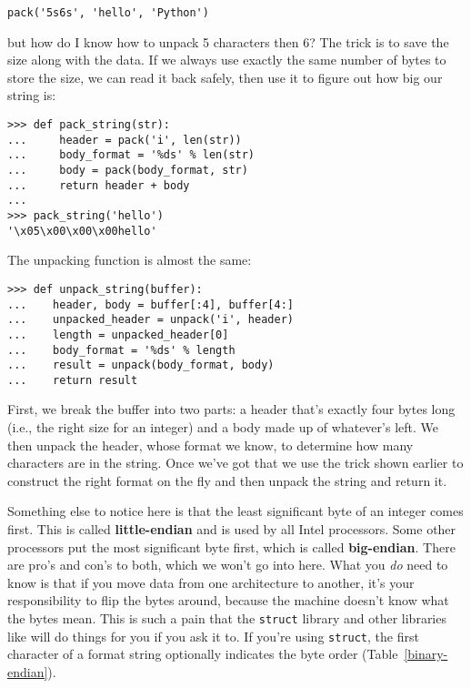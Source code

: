 \documentclass{scrbook}
\newcommand{\tblref}[1]{Table~\ref{#1}}
\newcommand{\glossref}[1]{\textbf{#1}}
\begin{document}
\begin{lstlisting}[frame=single,frameround=tttt]
pack('5s6s', 'hello', 'Python')
\end{lstlisting}


\noindent but how do I know how to unpack 5 characters then 6?
The trick is to save the size along with the data.
If we always use exactly the same number of bytes to store the size,
we can read it back safely,
then use it to figure out how big our string is:

\begin{lstlisting}[frame=single,frameround=tttt]
>>> def pack_string(str):
...     header = pack('i', len(str))
...     body_format = '%ds' % len(str)
...     body = pack(body_format, str)
...     return header + body
...
>>> pack_string('hello')
'\x05\x00\x00\x00hello'
\end{lstlisting}


The unpacking function is almost the same:

\begin{lstlisting}[frame=single,frameround=tttt]
>>> def unpack_string(buffer):
...    header, body = buffer[:4], buffer[4:]
...    unpacked_header = unpack('i', header)
...    length = unpacked_header[0]
...    body_format = '%ds' % length
...    result = unpack(body_format, body)
...    return result
\end{lstlisting}


First, we break the buffer into two parts:
a header that's exactly four bytes long
(i.e., the right size for an integer)
and a body made up of whatever's left.
We then unpack the header,
whose format we know,
to determine how many characters are in the string.
Once we've got that we use the trick shown earlier
to construct the right format on the fly
and then unpack the string and return it.


Something else to notice here is that
the least significant byte of an integer comes first.
This is called \glossref{little-endian} and is used by all Intel processors.
Some other processors put the most significant byte first,
which is called \glossref{big-endian}.
There are pro's and con's to both, which we won't go into here.
What you \emph{do} need to know is that if you move data from one architecture to another,
it's your responsibility to flip the bytes around,
because the machine doesn't know what the bytes mean.
This is such a pain that the \texttt{struct} library and other libraries like
will do things for you if you ask it to.
If you're using \texttt{struct},
the first character of a format string optionally indicates the byte order
(\tblref{binary-endian}).
\end{document}
